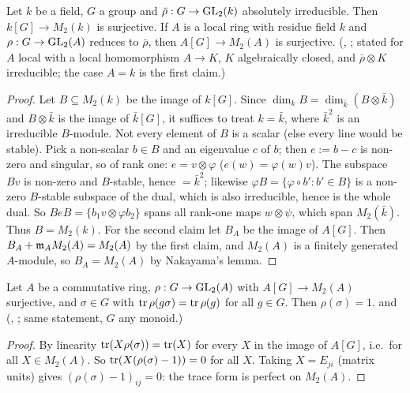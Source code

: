 \begin{lemma}\label{lem:s06-burnside}
Let $k$ be a field, $G$ a group and $\bar\rho:G\to\mathrm{GL}_2(k)$ absolutely irreducible. Then $k[G]\to M_2(k)$ is surjective. If $A$ is a local
ring with residue field $k$ and $\rho:G\to\mathrm{GL}_2(A)$ reduces to $\bar\rho$, then $A[G]\to M_2(A)$ is surjective. \stproved{}
\stformal{} (, ; stated for $A$ local with a local homomorphism $A\to K$, $K$ algebraically closed, and $\bar\rho\otimes K$ irreducible; the case $A=k$ is the first claim.)
\end{lemma}
\begin{proof}
Let $B\subseteq M_2(k)$ be the image of $k[G]$. Since $\dim_kB=\dim_{\bar k}(B\otimes\bar k)$ and $B\otimes\bar k$ is the image of
$\bar k[G]$, it suffices to treat $k=\bar k$, where $\bar k^2$ is an irreducible $B$-module. Not every element of $B$ is a scalar (else every
line would be stable). Pick a non-scalar $b\in B$ and an eigenvalue $c$ of $b$; then $e:=b-c$ is non-zero and singular, so of rank one:
$e=v\otimes\varphi$ ($e(w)=\varphi(w)v$). The subspace $Bv$ is non-zero and $B$-stable, hence $=\bar k^2$; likewise
$\varphi B=\{\varphi\circ b':b'\in B\}$ is a non-zero $B$-stable subspace of the dual, which is also irreducible, hence is the whole dual.
So $BeB=\{b_1v\otimes\varphi b_2\}$ spans all rank-one maps $w\otimes\psi$, which span $M_2(\bar k)$. Thus $B=M_2(k)$.
For the second claim let $B_A$ be the image of $A[G]$. Then $B_A+\mathfrak{m}_AM_2(A)=M_2(A)$ by the first claim, and $M_2(A)$ is a finitely
generated $A$-module, so $B_A=M_2(A)$ by Nakayama's lemma.
\end{proof}

\begin{lemma}\label{lem:s06-traceform}
Let $A$ be a commutative ring, $\rho:G\to\mathrm{GL}_2(A)$ with $A[G]\to M_2(A)$ surjective, and $\sigma\in G$ with $\operatorname{tr}\rho(g\sigma)=\operatorname{tr}\rho(g)$ for all
$g\in G$. Then $\rho(\sigma)=1$. \stproved{} and \stformal{} (, ; same statement, $G$ any monoid.)
\end{lemma}
\begin{proof}
By linearity $\operatorname{tr}(X\rho(\sigma))=\operatorname{tr}(X)$ for every $X$ in the image of $A[G]$, i.e.\ for all $X\in M_2(A)$. So $\operatorname{tr}(X(\rho(\sigma)-1))=0$ for all $X$.
Taking $X=E_{ji}$ (matrix units) gives $(\rho(\sigma)-1)_{ij}=0$: the trace form is perfect on $M_2(A)$.
\end{proof}

